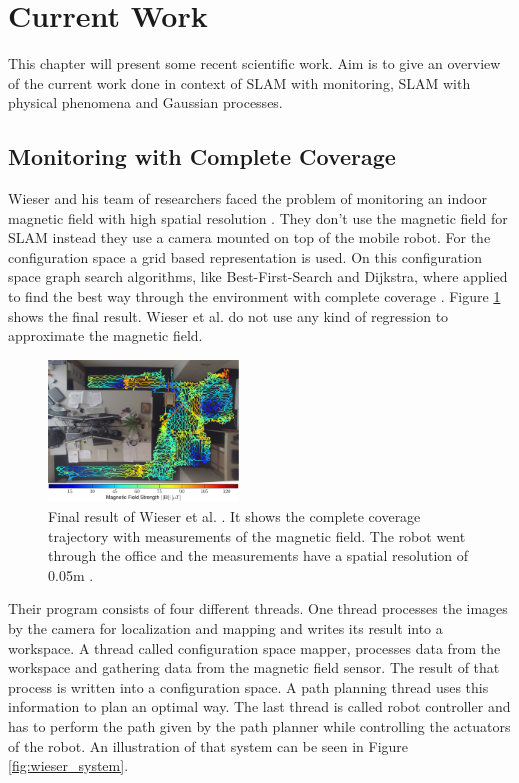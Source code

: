 \section{Current Work}
This chapter will present some recent scientific work. Aim is to give an overview
of the current work done in context of SLAM with monitoring, SLAM with physical phenomena and 
Gaussian processes. 

\subsection{Monitoring with Complete Coverage}
\label{chap:complete_coverage}
Wieser and his team of researchers faced the problem of monitoring an indoor magnetic field with high
spatial resolution \cite{wieser_slam_indoor_2014}. They don't use the magnetic field for
SLAM instead they use a camera mounted on top of the mobile robot. For the configuration space
a grid based representation is used. On this configuration space graph search algorithms, like 
Best-First-Search and Dijkstra, where applied to find the best way through the environment with
complete coverage \cite{wieser_slam_indoor_2014}. Figure \ref{fig:wieser_result} shows
the final result. Wieser et al. do not use any kind of regression to approximate the magnetic field.

\begin{figure}[h!]
	\centering
	\includegraphics[width=0.45\textwidth]{images/wieser_result.png}
	\caption{
            Final result of Wieser et al. \cite{wieser_slam_indoor_2014}. It shows
            the complete coverage trajectory with measurements of the magnetic 
            field. The robot went through the office and the
            measurements have a spatial resolution of 0.05m \cite{wieser_slam_indoor_2014}.
        }
	\label{fig:wieser_result}
\end{figure}

Their program consists of four different threads. One thread processes the images by the camera
for localization and mapping and writes its result into a workspace. A thread called configuration
space mapper, processes data from the workspace and gathering data from the magnetic field sensor.
The result of that process is written into a configuration space. A path planning thread uses this
information to plan an optimal way. The last thread is called robot controller and has to perform 
the path given by the path planner while controlling the actuators of the robot. An illustration of 
that system can be seen in Figure \ref{fig:wieser_system}.

